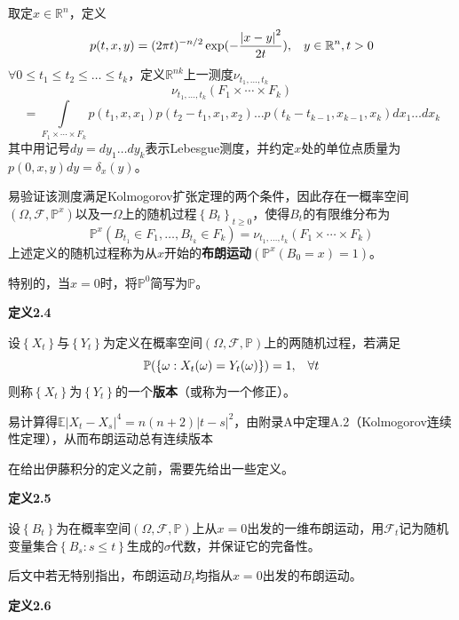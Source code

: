 \documentclass[UTF8，12pt]{ctexart}
\numberwithin{equation}{section}
\begin{document}
取定$x\in \mathbb{R}^n$，定义
\[
p(t,x,y)=(2\pi t)^{-n/2}\exp(-\frac{\left \vert x-y \right \vert^2}{2t}),\hspace{0.3cm} y\in \mathbb{R}^n,t>0
\]
\noindent $\forall 0\le t_1\le t_2\le\ldots\le t_k$，定义$\mathbb{R}^{nk}$上一测度$\nu_{t_1, \dots, t_k}$
\[
\nu_{t_1, \dots, t_k} (F_1 \times \cdots \times F_k) 
\]
\[
= \int\limits_{F_1 \times \cdots \times F_k}p(t_1,x,x_1)p(t_2-t_1,x_1,x_2)\ldots p(t_k-t_{k-1},x_{k-1},x_{k})dx_1\ldots dx_k
\]
其中用记号$dy=dy_1\ldots dy_k$表示Lebesgue测度，并约定$x$处的单位点质量为$p(0,x,y)dy=\delta _x(y)$。

易验证该测度满足Kolmogorov扩张定理的两个条件，因此存在一概率空间$(\Omega,\mathcal{F},\mathbb{P}^x)$以及一$\Omega$上的随机过程$\left \{ B_t\right \}_{t\ge 0}$，使得$B_t$的有限维分布为
\[
\mathbb{P}^x(B_{t_1}\in F_1,\ldots,B_{t_k}\in F_k)=\nu_{t_1, \dots, t_k} (F_1 \times \cdots \times F_k)
\]
上述定义的随机过程称为从$x$开始的\textbf{布朗运动}$(\mathbb{P}^x(B_0=x)=1)$。

特别的，当$x=0$时，将$\mathbb{P}^0$简写为$\mathbb{P}$。

\vspace{0.3cm}
\noindent \textbf{定义2.4}

设$\left \{ X_t\right \}$与$\left \{ Y_t\right \}$为定义在概率空间$(\Omega,\mathcal{F},\mathbb{P})$上的两随机过程，若满足
\[
\mathbb{P}(\left \{ \omega :X_t(\omega)=Y_t(\omega)\right \})=1,\hspace{0.3cm}\forall t
\]
则称$\left \{ X_t\right \}$为$\left \{ Y_t\right \}$的一个\textbf{版本}（或称为一个修正）。

易计算得$\mathbb{E}\left\vert X_t-X_s\right\vert^4=n(n+2)\left\vert t-s\right\vert^2$，由附录A中定理A.2（Kolmogorov连续性定理），从而布朗运动总有连续版本

\vspace{0.3cm}
在给出伊藤积分的定义之前，需要先给出一些定义。

\vspace{0.3cm}
\noindent \textbf{定义2.5}

设$\left\{B_t\right\}$为在概率空间$(\Omega,\mathcal{F},\mathbb{P})$上从$x=0$出发的一维布朗运动，用$\mathcal{F}_t$记为随机变量集合$\left\{B_s:s\le t\right\}$生成的$\sigma$代数，并保证它的完备性。

\vspace{0.3cm}
后文中若无特别指出，布朗运动$B_t$均指从$x=0$出发的布朗运动。

\vspace{0.3cm}
\noindent \textbf{定义2.6}
\end{document}
